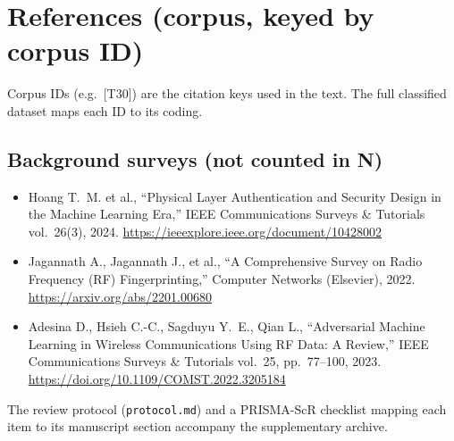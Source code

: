 \documentclass[11pt,a4paper]{article}
\begin{document}
\section*{References (corpus, keyed by corpus ID)}
Corpus IDs (e.g.\ [T30]) are the citation keys used in the text. The full classified dataset maps each ID to its coding.


\subsection*{Background surveys (not counted in N)}
\begin{itemize}
\item[BG2] Hoang T.~M. et al., ``Physical Layer Authentication and Security Design in the Machine Learning Era,'' IEEE Communications Surveys \& Tutorials vol.~26(3), 2024. \url{https://ieeexplore.ieee.org/document/10428002}
\item[BG3] Jagannath A., Jagannath J., et al., ``A Comprehensive Survey on Radio Frequency (RF) Fingerprinting,'' Computer Networks (Elsevier), 2022. \url{https://arxiv.org/abs/2201.00680}
\item[BG7] Adesina D., Hsieh C.-C., Sagduyu Y.~E., Qian L., ``Adversarial Machine Learning in Wireless Communications Using RF Data: A Review,'' IEEE Communications Surveys \& Tutorials vol.~25, pp.~77--100, 2023. \url{https://doi.org/10.1109/COMST.2022.3205184}
\end{itemize}
The review protocol (\texttt{protocol.md}) and a PRISMA-ScR checklist mapping each item to its manuscript section accompany the supplementary archive.
\end{document}
